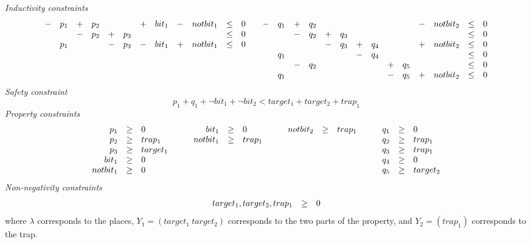 \smallskip
\noindent \emph{Inductivity constraints}
$$
\begin{array}[t]{clclclclclcl}
    -  & p_1 &  +  & p_2 &     &     &  +  & bit_1 &  -  & notbit_1 &  \le  & 0 \\
       &     &  -  & p_2 &  +  & p_3 &     &       &     &          &  \le  & 0 \\
       & p_1 &     &     &  -  & p_3 &  -  & bit_1 &  +  & notbit_1 &  \le  & 0
\end{array}\quad
\begin{array}[t]{clclclclclclclclclcl}
    -  & q_1 &  +  & q_2 &     &     &     &     &     &     &  -  & notbit_2 &  \le  & 0  \\
       &     &  -  & q_2 &  +  & q_3 &     &     &     &     &     &          &  \le  & 0  \\
       &     &     &     &  -  & q_3 &  +  & q_4 &     &     &  +  & notbit_2 &  \le  & 0  \\
       & q_1 &     &     &     &     &  -  & q_4 &     &     &     &          &  \le  & 0  \\
       &     &  -  & q_2 &     &     &     &     &  +  & q_5 &     &          &  \le  & 0  \\
       & q_1 &     &     &     &     &     &     &  -  & q_5 &  +  & notbit_2 &  \le  & 0 
\end{array}
$$
\emph{Safety constraint}
$$    
p_1 + q_1 + \neg bit_1 + \neg bit_2 < target_1 + target_2 + trap_1
$$
\emph{Property constraints}
$$
\begin{array}[t]{rcl}
  p_1   & \ge & 0 \\
  p_2   & \ge & trap_1 \\
  p_3   & \ge & target_1 \\
  bit_1 & \ge & 0 \\
  notbit_1 & \ge & 0
\end{array}
\qquad
\begin{array}[t]{rcl}
  bit_1 & \ge & 0 \\
  notbit_1 & \ge & trap_1
\end{array}
\qquad
\begin{array}[t]{rcl}
  notbit_2 & \ge & trap_1
\end{array}
\qquad
\begin{array}[t]{rcl}
  q_1   & \ge & 0 \\
  q_2   & \ge & trap_1 \\
  q_3   & \ge & trap_1 \\
  q_4   & \ge & 0 \\
  q_5   & \ge & target_2 \\
\end{array}
$$
\emph{Non-negativity constraints}
$$
\begin{array}[t]{rcl}
  target_1, target_2, trap_1  & \ge & 0 
\end{array}
$$
%
where $\lambda$ corresponds to the places,
$Y_1 = (target_1\ target_2)$ corresponds to the two parts of the property, and
$Y_2 = (trap_1)$ corresponds to the trap.

